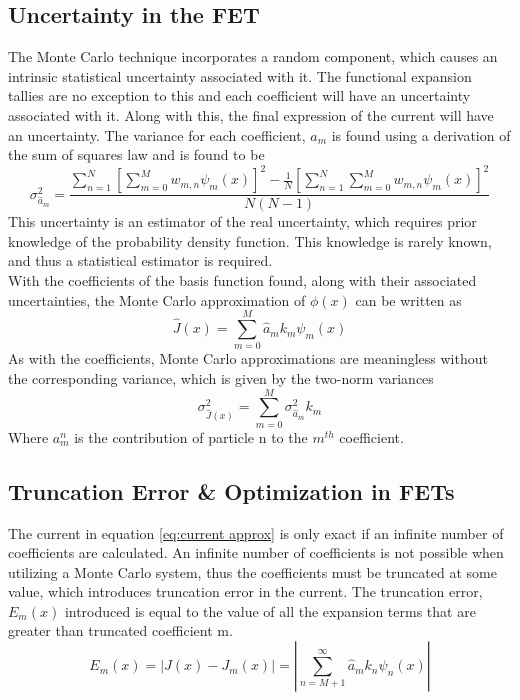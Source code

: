 \documentclass[10tma4paper]{article}
\begin{document}
\subsection{Uncertainty in the FET}\label{UIC}

The Monte Carlo technique incorporates a random component, which causes an intrinsic statistical uncertainty associated with it. The functional expansion tallies are no exception to this and each coefficient will have an uncertainty associated with it. Along with this, the final expression of the current will have an uncertainty. The variance for each coefficient, $a_{m}$ is found using a derivation of the sum of squares law and is found to be 
	\begin{equation} \label{eq:coeff unc}
	\sigma_{\hat{a}_{m}}^2 = \frac{\sum_{n=1}^{N}[\sum_{m=0}^{M}w_{m,n}\psi_{m}(x)]^{2} - \frac{1}{N}[ \sum_{n=1}^{N}\sum_{m=0}^{M}w_{m,n}\psi_{m}(x)]^{2}}{N(N-1)}
	\end{equation}
This uncertainty is an estimator of the real uncertainty, which requires prior knowledge of the probability density function. This knowledge is rarely known, and thus a statistical estimator is required.
\\With the coefficients of the basis function found, along with their associated uncertainties, the Monte Carlo approximation of $\phi(x)$ can be written as
	\begin{equation} \label{eq:current hat}
	\hat{J}(x) = \sum_{m=0}^{M} \hat{a}_{m}k_{m}\psi_{m}(x)
	\end{equation}
As with the coefficients, Monte Carlo approximations are meaningless without the corresponding variance, which is given by the two-norm variances
	\begin{equation} \label{eq:current unc}
	\sigma_{\hat{J}(x)}^2=\sum_{m=0}^{M}\sigma_{\hat{a}_{m}}^2k_{m}
	\end{equation}
Where $a_{m}^{n}$ is the contribution of particle n to the $m^{th}$ coefficient.

\subsection{Truncation Error \& Optimization in FETs}\label{TEO}

The current in equation \eqref{eq:current approx} is only exact if an infinite number of coefficients are calculated. An infinite number of coefficients is not possible when utilizing a Monte Carlo system, thus the coefficients must be truncated at some value, which introduces truncation error in the current. The truncation error, $E_{m}(x)$ introduced is equal to the value of all the expansion terms that are greater than truncated coefficient m.
\begin{equation}\label{eq:trunc unc}
E_{m}(x) = |J(x)-J_{m}(x)|=|\sum_{n=M+1}^{\infty}\hat{a}_{m}k_{n}\psi_{n}(x)|
\end{equation}
\end{document}
